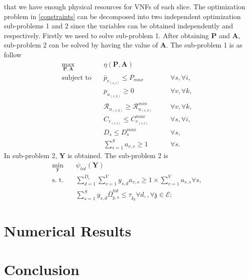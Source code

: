 \documentclass[conference]{IEEEtran}
\begin{document}
that we have enough physical resources for VNFs of each slice.\newline
The optimization problem in \eqref{constraints} can be decomposed into two independent optimization sub-problems 1 and 2 since the variables can be obtained independently and respectively. Firstly we need to solve sub-problem 1. After obtaining $\boldsymbol{P}$ and $ \boldsymbol{A}$, sub-problem 2 can be solved by having the value of $ \boldsymbol{A}$. 
The sub-problem 1 is as follow
\begin{subequations}
\begin{alignat}{4}
\max\limits_{\boldsymbol{P}, \boldsymbol{A} }   \quad &   \eta(\boldsymbol{P},\boldsymbol{A})\\
\text{subject to} \quad  & \bar{p}_{r_{(s,i)}} \leq P_{max} && \quad \forall s, \forall i,   \\
&p_{u_{(v,k)}}  \geq 0  &&\quad \forall v, \forall k, \\
&\mathcal{R}_{u_{(v,k)}} \geq  \mathcal{R}_{u_{(v,k)}}^{min} && \quad \forall v, \forall k, \\
&C_{r_{(s,i)}} \leq C_{r_{(s,i)}}^{max}  &&\quad \forall s, \forall i,\label{cc14} \\
&D_{s} \leq D_{s}^{max}  &&\quad \forall s, \label{cc15} \\
& \textstyle  \sum_{s=1}^{S}a_{v,s} \geq 1 &&\quad \forall s.
\end{alignat}
\label{constraints1}
\end{subequations}
In sub-problem 2, $ \boldsymbol{Y}$ is obtained. The sub-problem 2 is
\begin{subequations}
\begin{alignat}{4}
\min\limits_{\boldsymbol{y} }   \quad &   \psi_{tot}(\boldsymbol{Y})\\
\text{s. t.} \quad & \textstyle \sum_{d=1}^{D_c}\sum_{v=1}^{V}y_{s,d}a_{v,s} \geq 1\times\sum_{v=1}^{V}a_{v,s} \forall s, \\
 &\textstyle  \sum_{s=1}^{S} y_{s,d} \bar{\Omega}_{\mathfrak{z},s}^{tot}  \leq   \tau_{\mathfrak{z}_d}  \forall d,, \forall \mathfrak{z}\in \mathcal{E};  \label{eqomega}
\end{alignat}
\label{constraints2}
\end{subequations}
\section{Numerical Results}\label{simul}

\section{Conclusion}





\end{document}
